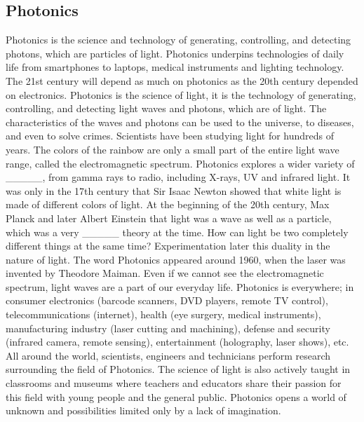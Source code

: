 \subsection*{Photonics}
Photonics is the science and technology of generating, controlling, and detecting
photons, which are particles of light. Photonics underpins technologies of daily life from smartphones
to laptops, medical instruments and lighting technology. The 21st century will depend as much
on photonics as the 20th century depended on electronics.
Photonics is the science of light, it is the technology of generating, controlling, and detecting light
waves and photons, which are \underline{\hspace{2cm}} of light. The characteristics of the waves and
photons can be used to \underline{\hspace{2cm}} the universe, to \underline{\hspace{2cm}} diseases, and even to solve
crimes. Scientists have been studying light for hundreds of years. The colors of the rainbow are only
a small part of the entire light wave range, called the electromagnetic spectrum. Photonics explores
a wider variety of \_\_\_\_\_, from gamma rays to radio, including X-rays, UV and infrared
light. It was only in the 17th century that Sir Isaac Newton showed that white light is made of
different colors of light. At the beginning of the 20th century, Max Planck and later Albert Einstein
\underline{\hspace{2cm}} that light was a wave as well as a particle, which was a very \_\_\_\_\_
theory at the time. How can light be two completely different things at the same time?
Experimentation later \underline{\hspace{2cm}} this duality in the nature of light.
The word Photonics appeared around 1960, when the laser was invented by Theodore Maiman.
Even if we cannot see the \underline{\hspace{2cm}} electromagnetic spectrum, \underline{\hspace{2cm}} light waves
are a part of our everyday life. Photonics is everywhere; in consumer electronics (barcode scanners,
DVD players, remote TV control), telecommunications (internet), health (eye surgery, medical
instruments), manufacturing industry (laser cutting and machining), defense and security (infrared
camera, remote sensing), entertainment (holography, laser shows), etc.
All around the world, scientists, engineers and technicians perform \underline{\hspace{2cm}} research
surrounding the field of Photonics. The science of light is also actively taught in classrooms and
museums where teachers and educators share their passion for this field with young people and the
general public. Photonics opens a world of unknown and \underline{\hspace{2cm}} possibilities limited
only by a lack of imagination.

